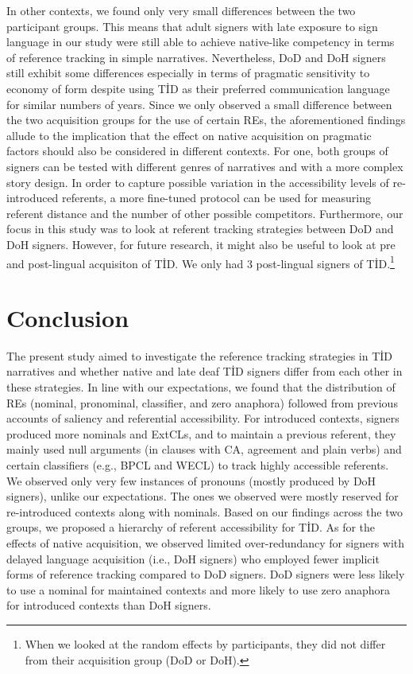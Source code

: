 \documentclass[review]{elsarticle} %
\begin{document}
In other contexts, we found only very small differences between the two
participant groups. This means that adult signers with late exposure to
sign language in our study were still able to achieve native-like
competency in terms of reference tracking in simple narratives.
Nevertheless, DoD and DoH signers still exhibit some differences
especially in terms of pragmatic sensitivity to economy of form despite
using TİD as their preferred communication language for similar numbers
of years. Since we only observed a small difference between the two
acquisition groups for the use of certain REs, the aforementioned
findings allude to the implication that the effect on native acquisition
on pragmatic factors should also be considered in different contexts.
For one, both groups of signers can be tested with different genres of
narratives and with a more complex story design. In order to capture
possible variation in the accessibility levels of re-introduced
referents, a more fine-tuned protocol \citep[as in][]{toole1996} can be
used for measuring referent distance and the number of other possible
competitors. Furthermore, our focus in this study was to look at
referent tracking strategies between DoD and DoH signers. However, for
future research, it might also be useful to look at pre and post-lingual
acquisiton of TİD. We only had 3 post-lingual signers of
TİD.\footnote{When we looked at the random effects by participants, they did not differ from their acquisition group (DoD or DoH).}

\hypertarget{conclusion}{%
\section{Conclusion}\label{conclusion}}

The present study aimed to investigate the reference tracking strategies
in TİD narratives and whether native and late deaf TİD signers differ
from each other in these strategies. In line with our expectations, we
found that the distribution of REs (nominal, pronominal, classifier, and
zero anaphora) followed from previous accounts of saliency and
referential accessibility. For introduced contexts, signers produced
more nominals and ExtCLs, and to maintain a previous referent, they
mainly used null arguments (in clauses with CA, agreement and plain
verbs) and certain classifiers (e.g., BPCL and WECL) to track highly
accessible referents. We observed only very few instances of pronouns
(mostly produced by DoH signers), unlike our expectations. The ones we
observed were mostly reserved for re-introduced contexts along with
nominals. Based on our findings across the two groups, we proposed a
hierarchy of referent accessibility for TİD. As for the effects of
native acquisition, we observed limited over-redundancy for signers with
delayed language acquisition (i.e., DoH signers) who employed fewer
implicit forms of reference tracking compared to DoD signers. DoD
signers were less likely to use a nominal for maintained contexts and
more likely to use zero anaphora for introduced contexts than DoH
signers.
\end{document}
